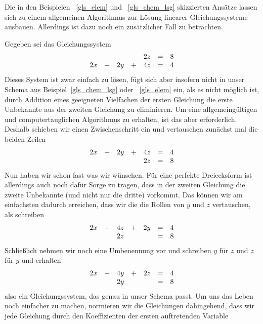 Die in den Beispielen ~\ref{gls_elem} und ~\ref{gls_chem_lsg} skizzierten Ansätze lassen sich zu einem 
allgemeinen Algorithmus zur Lösung linearer Gleichungssysteme ausbauen. Allerdings ist dazu noch ein 
zusätzlicher Fall zu betrachten. 

\begin{beispiel}\label{gls_vertausch}  Gegeben sei das Gleichungssystem
  $$ \begin{array} {l c l c l c l}
      &  &  & & 2 z & = & 8 \\
     2 x & + & 2 y & + & 4 z & = & 4 
     \end{array} $$
Dieses System ist zwar einfach zu lösen, fügt sich aber insofern nicht in unser Schema aus 
Beispiel~\ref{gls_chem_lsg} oder ~\ref{gls_elem} ein, als es nicht möglich ist, durch Addition 
eines geeigneten Vielfachen der ersten Gleichung die erste Unbekannte aus der zweiten Gleichung zu 
eliminieren. Um eine allgemeingültigen und computertauglichen Algorithmus zu erhalten, ist das 
aber erforderlich. Deshalb schieben wir einen Zwischenschritt ein und vertauschen zunächst mal 
die beiden Zeilen
  	$$ \begin{array} {l c l c l c l}
   	2 x & + & 2 y & + & 4z & = & 4 \\
   	&  &  & & 2z & = & 8 \\
  	\end{array} $$
Nun haben wir schon fast was wir wünschen. Für eine perfekte Dreiecksform ist allerdings auch noch 
dafür Sorge zu tragen, dass in der zweiten Gleichung die zweite Unbekannte (und nicht nur die dritte) 
vorkommt. Das können wir am einfachsten dadurch erreichen, dass wir die die Rollen von $y$ und $z$ vertauschen, 
als schreiben
  	$$ \begin{array} {l c l c l c l}
     	2 x & + & 4 z & + & 2y & = & 4 \\
   	&  & 2 z  & & & = & 8 \\
  	\end{array} $$
Schließlich nehmen wir noch eine Umbenennung vor und schreiben $y$ für $z$ und $z$ für $y$ und   
erhalten
  	$$ \begin{array} {l c l c l c l}
     	2 x & + & 4 y & + & 2 z & = & 4 \\
      	&  & 2 y & & & = & 8 \\
     	\end{array} $$
also ein Gleichungssystem, das genau in unser Schema passt. Um uns das Leben noch einfacher zu machen, normieren 
wir die Gleichungen dahingehend, dass wir jede Gleichung durch den Koeffizienten der ersten auftretenden Variable 

\end{beispiel}

